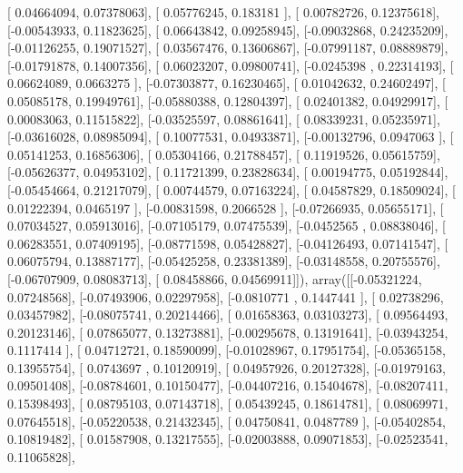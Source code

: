 \documentclass{article}
\begin{document}
       [ 0.04664094,  0.07378063],
       [ 0.05776245,  0.183181  ],
       [ 0.00782726,  0.12375618],
       [-0.00543933,  0.11823625],
       [ 0.06643842,  0.09258945],
       [-0.09032868,  0.24235209],
       [-0.01126255,  0.19071527],
       [ 0.03567476,  0.13606867],
       [-0.07991187,  0.08889879],
       [-0.01791878,  0.14007356],
       [ 0.06023207,  0.09800741],
       [-0.0245398 ,  0.22314193],
       [ 0.06624089,  0.0663275 ],
       [-0.07303877,  0.16230465],
       [ 0.01042632,  0.24602497],
       [ 0.05085178,  0.19949761],
       [-0.05880388,  0.12804397],
       [ 0.02401382,  0.04929917],
       [ 0.00083063,  0.11515822],
       [-0.03525597,  0.08861641],
       [ 0.08339231,  0.05235971],
       [-0.03616028,  0.08985094],
       [ 0.10077531,  0.04933871],
       [-0.00132796,  0.0947063 ],
       [ 0.05141253,  0.16856306],
       [ 0.05304166,  0.21788457],
       [ 0.11919526,  0.05615759],
       [-0.05626377,  0.04953102],
       [ 0.11721399,  0.23828634],
       [ 0.00194775,  0.05192844],
       [-0.05454664,  0.21217079],
       [ 0.00744579,  0.07163224],
       [ 0.04587829,  0.18509024],
       [ 0.01222394,  0.0465197 ],
       [-0.00831598,  0.2066528 ],
       [-0.07266935,  0.05655171],
       [ 0.07034527,  0.05913016],
       [-0.07105179,  0.07475539],
       [-0.0452565 ,  0.08838046],
       [ 0.06283551,  0.07409195],
       [-0.08771598,  0.05428827],
       [-0.04126493,  0.07141547],
       [ 0.06075794,  0.13887177],
       [-0.05425258,  0.23381389],
       [-0.03148558,  0.20755576],
       [-0.06707909,  0.08083713],
       [ 0.08458866,  0.04569911]]), array([[-0.05321224,  0.07248568],
       [-0.07493906,  0.02297958],
       [-0.0810771 ,  0.1447441 ],
       [ 0.02738296,  0.03457982],
       [-0.08075741,  0.20214466],
       [ 0.01658363,  0.03103273],
       [ 0.09564493,  0.20123146],
       [ 0.07865077,  0.13273881],
       [-0.00295678,  0.13191641],
       [-0.03943254,  0.1117414 ],
       [ 0.04712721,  0.18590099],
       [-0.01028967,  0.17951754],
       [-0.05365158,  0.13955754],
       [ 0.0743697 ,  0.10120919],
       [ 0.04957926,  0.20127328],
       [-0.01979163,  0.09501408],
       [-0.08784601,  0.10150477],
       [-0.04407216,  0.15404678],
       [-0.08207411,  0.15398493],
       [ 0.08795103,  0.07143718],
       [ 0.05439245,  0.18614781],
       [ 0.08069971,  0.07645518],
       [-0.05220538,  0.21432345],
       [ 0.04750841,  0.0487789 ],
       [-0.05402854,  0.10819482],
       [ 0.01587908,  0.13217555],
       [-0.02003888,  0.09071853],
       [-0.02523541,  0.11065828],
\end{document}
